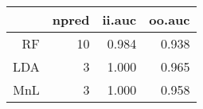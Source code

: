 \begin{table}[ht]
\centering
\begin{tabular}{rrrr}
  \hline
 & npred & ii.auc & oo.auc \\ 
  \hline
RF &   10 & 0.984 & 0.938 \\ 
  LDA &    3 & 1.000 & 0.965 \\ 
  MnL &    3 & 1.000 & 0.958 \\ 
   \hline
\end{tabular}
\label{tab:second_res}
\end{table}
